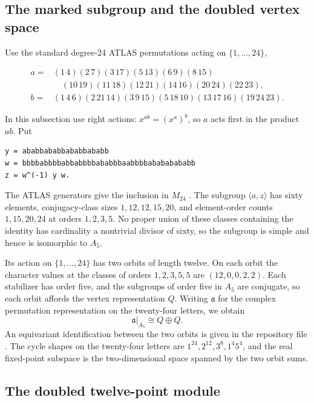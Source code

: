 \documentclass[11pt,a4paper]{article}
\begin{document}
\subsection{The marked subgroup and the doubled vertex space}\label{subsec:H1}

Use the standard degree-24 ATLAS permutations acting on \(\{1,\ldots,24\}\),

\[
\begin{aligned}
a={}&(1\,4)(2\,7)(3\,17)(5\,13)(6\,9)(8\,15)\\
&\quad(10\,19)(11\,18)(12\,21)(14\,16)(20\,24)(22\,23),\\
b={}&(1\,4\,6)(2\,21\,14)(3\,9\,15)(5\,18\,10)
(13\,17\,16)(19\,24\,23).
\end{aligned}
\]

In this subsection use right actions: \(x^{ab}=(x^a)^b\), so \(a\) acts first in the product \(ab\). Put

\begin{verbatim}
y = ababbababbababbababb
w = bbbbabbbbabbabbbbababbbaabbbbabababababb
z = w^(-1) y w.
\end{verbatim}

The ATLAS generators give the inclusion in \(M_{24}\) \citep{AtlasM24}. The subgroup \(\langle a,z\rangle\) has sixty elements, conjugacy-class sizes \(1,12,12,15,20\), and element-order counts \(1,15,20,24\) at orders \(1,2,3,5\). No proper union of these classes containing the identity has cardinality a nontrivial divisor of sixty, so the subgroup is simple and hence is isomorphic to \(A_5\).

Its action on \(\{1,\ldots,24\}\) has two orbits of length twelve. On each orbit the character values at the classes of orders \(1,2,3,5,5\) are \((12,0,0,2,2)\). Each stabilizer has order five, and the subgroups of order five in \(A_5\) are conjugate, so each orbit affords the vertex representation \(Q\). Writing \(\mathfrak a\) for the complex permutation representation on the twenty-four letters, we obtain
\[
\mathfrak a|_{A_5}\cong Q\oplus Q.
\]
An equivariant identification between the two orbits is given in the repository file . The cycle shapes on the twenty-four letters are \(1^{24},2^{12},3^8,1^4 5^4\), and the real fixed-point subspace is the two-dimensional space spanned by the two orbit sums.

\subsection{The doubled twelve-point module}
\end{document}
